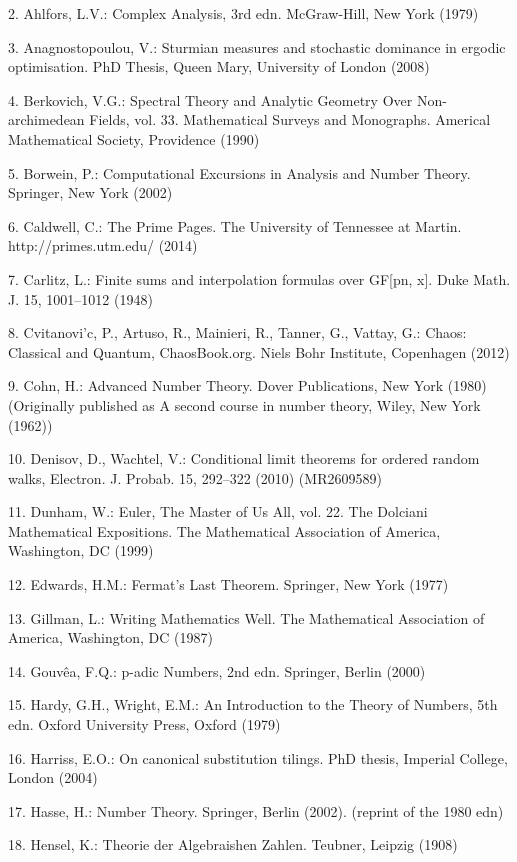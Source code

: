 \documentclass[11pt]{article}
\theoremstyle{plain}
\theoremstyle{definition}
\begin{document}
2. Ahlfors, L.V.: Complex Analysis, 3rd edn. McGraw-Hill, New York (1979)

3. Anagnostopoulou, V.: Sturmian measures and stochastic dominance in ergodic optimisation. PhD Thesis, Queen Mary, University of London (2008)

4. Berkovich, V.G.: Spectral Theory and Analytic Geometry Over Non-archimedean Fields, vol. 33. Mathematical Surveys and Monographs. Americal Mathematical Society, Providence (1990)

5. Borwein, P.: Computational Excursions in Analysis and Number Theory. Springer, New York (2002)

6. Caldwell, C.: The Prime Pages. The University of Tennessee at Martin. http://primes.utm.edu/ (2014)

7. Carlitz, L.: Finite sums and interpolation formulas over GF[pn, x]. Duke Math. J. 15, 1001--1012 (1948)

8. Cvitanovi'c, P., Artuso, R., Mainieri, R., Tanner, G., Vattay, G.: Chaos: Classical and Quantum, ChaosBook.org. Niels Bohr Institute, Copenhagen (2012)

9. Cohn, H.: Advanced Number Theory. Dover Publications, New York (1980) (Originally published as A second course in number theory, Wiley, New York (1962))

10. Denisov, D., Wachtel, V.: Conditional limit theorems for ordered random walks, Electron. J. Probab. 15, 292--322 (2010) (MR2609589)

11. Dunham, W.: Euler, The Master of Us All, vol. 22. The Dolciani Mathematical Expositions. The Mathematical Association of America, Washington, DC (1999)

12. Edwards, H.M.: Fermat's Last Theorem. Springer, New York (1977)

13. Gillman, L.: Writing Mathematics Well. The Mathematical Association of America, Washington, DC (1987)

14. Gouvêa, F.Q.: p-adic Numbers, 2nd edn. Springer, Berlin (2000)

15. Hardy, G.H., Wright, E.M.: An Introduction to the Theory of Numbers, 5th edn. Oxford University Press, Oxford (1979)

16. Harriss, E.O.: On canonical substitution tilings. PhD thesis, Imperial College, London (2004)

17. Hasse, H.: Number Theory. Springer, Berlin (2002). (reprint of the 1980 edn)

18. Hensel, K.: Theorie der Algebraishen Zahlen. Teubner, Leipzig (1908)
\end{document}
